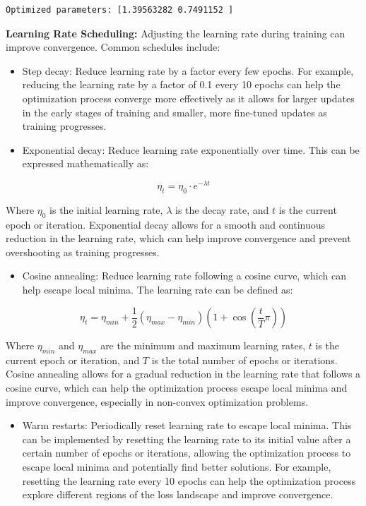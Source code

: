 \documentclass[
  letterpaper,
  DIV=11,
  numbers=noendperiod]{scrreprt}
\providecommand{\tightlist}{%
  \setlength{\itemsep}{0pt}\setlength{\parskip}{0pt}}
\begin{document}
\begin{verbatim}
Optimized parameters: [1.39563282 0.7491152 ]
\end{verbatim}

\textbf{Learning Rate Scheduling:} Adjusting the learning rate during
training can improve convergence. Common schedules include:

\begin{itemize}
\item
  Step decay: Reduce learning rate by a factor every few epochs. For
  example, reducing the learning rate by a factor of 0.1 every 10 epochs
  can help the optimization process converge more effectively as it
  allows for larger updates in the early stages of training and smaller,
  more fine-tuned updates as training progresses.
\item
  Exponential decay: Reduce learning rate exponentially over time. This
  can be expressed mathematically as:
\end{itemize}

\[\eta_t = \eta_0 \cdot e^{-\lambda t}\]

Where \(\eta_0\) is the initial learning rate, \(\lambda\) is the decay
rate, and \(t\) is the current epoch or iteration. Exponential decay
allows for a smooth and continuous reduction in the learning rate, which
can help improve convergence and prevent overshooting as training
progresses.

\begin{itemize}
\tightlist
\item
  Cosine annealing: Reduce learning rate following a cosine curve, which
  can help escape local minima. The learning rate can be defined as:
\end{itemize}

\[\eta_t = \eta_{min} + \frac{1}{2} (\eta_{max} - \eta_{min}) \left(1 + \cos\left(\frac{t}{T} \pi\right)\right)\]

Where \(\eta_{min}\) and \(\eta_{max}\) are the minimum and maximum
learning rates, \(t\) is the current epoch or iteration, and \(T\) is
the total number of epochs or iterations. Cosine annealing allows for a
gradual reduction in the learning rate that follows a cosine curve,
which can help the optimization process escape local minima and improve
convergence, especially in non-convex optimization problems.

\begin{itemize}
\tightlist
\item
  Warm restarts: Periodically reset learning rate to escape local
  minima. This can be implemented by resetting the learning rate to its
  initial value after a certain number of epochs or iterations, allowing
  the optimization process to escape local minima and potentially find
  better solutions. For example, resetting the learning rate every 10
  epochs can help the optimization process explore different regions of
  the loss landscape and improve convergence.
\end{itemize}
\end{document}
